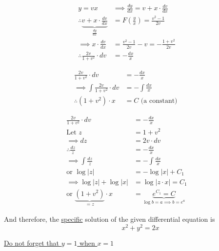 \documentclass[14pt,fleqn]{extarticle}
\begin{document}
\begin{problem}
\begin{step}
	\begin{align}
y = vx &\implies \frac{dy}{dx} = v + x\cdot\frac{dv}{dx} \\[5pt]
\therefore  \underbrace{v + x\cdot\frac{dv}{dx}}_{\frac{dy}{dx}} &= F\left(\frac{y}{x}\right) = \frac{v^2-1}{2v} \\
\implies x\cdot\frac{dv}{dx} &= \frac{v^2-1}{2v}- v = -\frac{1+v^2}{2v} \\
\therefore \frac{2v}{1+v^2}\cdot dv &= -\frac{dx}{x} 
\end{align} 
\end{step}
\begin{step}
	\begin{options}
		\correct
		
		\begin{align}
	\frac{2v}{1+v^2} \cdot dv &= -\frac{dx}{x} \\ 
	\implies \int \frac{2v}{1+v^2} \cdot dv &= -\int \frac{dx}{x} \\[5pt]
	\therefore \left(1+v^2 \right)\cdot x &= C \text{ (a constant) }
\end{align}

	\end{options}
	\reason

	\begin{align}
\frac{2v}{1+v^2}\cdot dv &= -\frac{dx}{x} \\
\text{Let } z &= 1+v^2\\
\implies dz &= 2v\cdot dv \\[5pt]
\therefore \frac{dz}{z} &= -\frac{dx}{x}\\
\implies \int\frac{dz}{z} &= -\int\frac{dx}{x} \\
\text{or } \log \vert z\vert &= -\log\vert x\vert + C_1 \\
\implies \log\vert z\vert + \log\vert x\vert &= \log\vert z\cdot x\vert = C_1 \\
\text{or } \underbrace{(1+v^2)}_{ = z}\cdot x &= \underbrace{e^{C_1} = C}_{\log b = a\implies b = e^a}
\end{align} 
\end{step}
\begin{step}
	\begin{options}
		\correct
		
		And therefore, the \underline{specific} solution of the given differential equation is  
		\[\qquad\qquad x^2 + y^2 = 2x \]

	\end{options}
	\reason

\underline{Do not forget that $y=1$ when $x=1$}


\end{step}
\end{problem}
\end{document}
